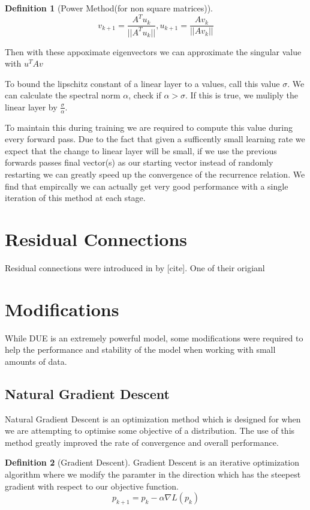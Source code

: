\documentclass[12pt, a4paper]{report}
\theoremstyle{definition}
\newtheorem{definition}{Definition}[section]
\begin{document}
\begin{definition}[Power Method(for non square matrices)]
    $$v_{k+1} = \frac{A^Tu_k}{||A^Tu_k||}, u_{k+1} = \frac{Av_k}{||Av_k||} $$
\end{definition}

Then with these appoximate eigenvectors we can approximate the singular value with $u^T A v$

To bound the lipschitz constant of a linear layer to a values, call this value $\sigma$. We can calculate the spectral norm $\alpha$, check if $\alpha > \sigma$. If this is true, we muliply the linear layer by $\frac{\sigma}{\alpha}$.

To maintain this during training we are required to compute this value during every forward pass. Due to the fact that given a sufficently small learning rate we expect that the change to linear layer will be small, if we use the previous forwards passes final vector(s) as our starting vector instead of randomly restarting we can greatly speed up the convergence of the recurrence relation. We find that empircally we can actually get very good performance with a single iteration of this method at each stage.


\section{Residual Connections}

Residual connections were introduced in by [cite]. One of their origianl 


\section{Modifications}

While DUE is an extremely powerful model, some modifications were required to help the performance and stability of the model when working with small amounts of data. 

\subsection{Natural Gradient Descent}

Natural Gradient Descent is an optimization method which is designed for when we are attempting to optimise some objective of a distribution. The use of this method greatly improved the rate of convergence and overall performance. \cite{NGD}


\begin{definition}[Gradient Descent]
    Gradient Descent is an iterative optimization algorithm where we modify the paramter in the direction which has the steepest gradient with respect to our objective function.
    $$p_{k+1} = p_{k} -  \alpha \nabla L(p_k)$$
\end{definition}
\end{document}
